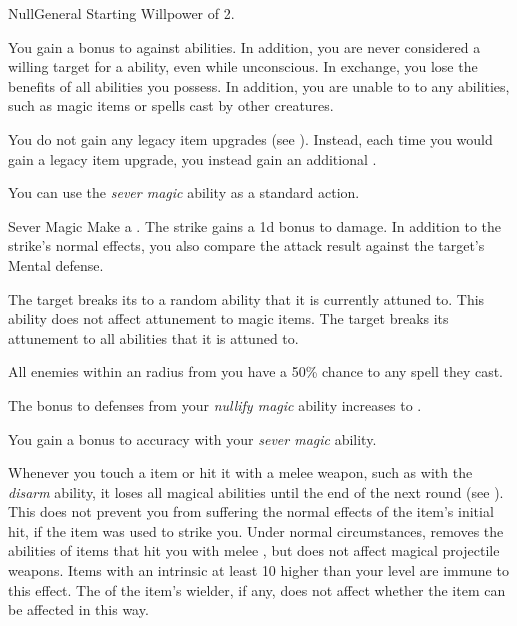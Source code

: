     \begin{feat}{Null}{General}
        \featpre Starting Willpower of 2.

         You gain a  bonus to  against  abilities.
        In addition, you are never considered a willing target for a  ability, even while unconscious.
        In exchange, you lose the benefits of all  abilities you possess.
        In addition, you are unable to  to any  abilities, such as magic items or spells cast by other creatures.

         You do not gain any legacy item upgrades (see ).
        Instead, each time you would gain a legacy item upgrade, you instead gain an additional .

         You can use the \textit{sever magic} ability as a standard action.
        \begin{apability}{Sever Magic}
            Make a .
            The strike gains a \plus1d bonus to damage.
            In addition to the strike's normal effects, you also compare the attack result against the target's Mental defense.

            \hit The target breaks its  to a random ability that it is currently attuned to.
            This ability does not affect attunement to magic items.
            \crit The target breaks its attunement to all abilities that it is attuned to.
        \end{apability}

         All enemies within an \areamed radius from you have a 50\% chance to  any spell they cast.

         The bonus to defenses from your \textit{nullify magic} ability increases to .

         You gain a  bonus to accuracy with your \textit{sever magic} ability.

         Whenever you touch a  item or hit it with a melee weapon, such as with the \textit{disarm} ability, it loses all magical abilities until the end of the next round (see ).
        This does not prevent you from suffering the normal effects of the item's initial hit, if the item was used to strike you.
        Under normal circumstances, removes the abilities of items that hit you with melee , but does not affect magical projectile weapons.
        Items with an intrinsic  at least 10 higher than your level are immune to this effect.
        The  of the item's wielder, if any, does not affect whether the item can be affected in this way.


\end{feat}
